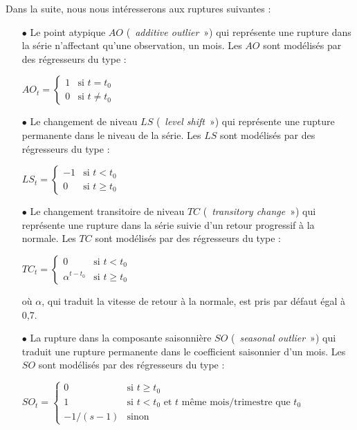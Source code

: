 \documentclass[12pt, a4paper, french]{article}
\begin{document}
Dans la suite, nous nous intéresserons aux ruptures suivantes :
\begin{itemize}
	\item[$\bullet$] Le point atypique $AO$ (\og~\emph{additive outlier}~») qui représente une rupture dans la série n'affectant qu'une observation, un mois. Les $AO$ sont modélisés par des régresseurs du type : 
	
$
AO_{t} = \left\{ \begin{array}{cl} 
                1 & \mbox{si } t=t_{0} \\
                0 & \mbox{si } t\neq t_{0}
               \end{array}
       \right.
$
	\item[$\bullet$] Le changement de niveau $LS$ (\og~\emph{level shift}~») qui représente une rupture permanente dans le niveau de la série. Les $LS$ sont modélisés par des régresseurs du type : 
	
$
LS_{t} = \left\{ \begin{array}{rl} 
                -1 & \mbox{si } t<t_{0} \\
                0 & \mbox{si } t\geq t_{0}
               \end{array}
       \right.
$
	\item[$\bullet$] Le changement transitoire de niveau $TC$ (\og~\emph{transitory change}~») qui représente une rupture dans la série suivie d'un retour progressif à la normale. Les $TC$ sont modélisés par des régresseurs du type : 
	
$
TC_{t} = \left\{ \begin{array}{cl} 
                0 & \mbox{si } t<t_{0} \\
                \alpha^{t-t_{0}} & \mbox{si } t \geq t_{0}
               \end{array}
       \right.
$

où $\alpha$, qui traduit la vitesse de retour à la normale, est pris par défaut égal à 0,7.
	\item[$\bullet$] La rupture dans la composante saisonnière $SO$ (\og~\emph{seasonal outlier}~») qui traduit une rupture permanente dans le coefficient saisonnier d'un mois. Les $SO$ sont modélisés par des régresseurs du type : 
	
$			
SO_{t} = \left\{ \begin{array}{cl} 
                0 & \mbox{si } t \geq t_{0} \\
								1 & \mbox{si } t < t_{0} \mbox{ et } t  \mbox{ même mois/trimestre que } t_{0}\\
                -1/(s-1) & \mbox{sinon }
               \end{array}
       \right.		
$
\end{itemize}
\end{document}
